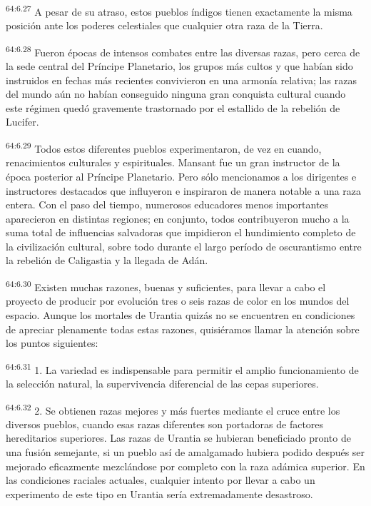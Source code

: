 \par
\textsuperscript{64:6.27} A pesar de su atraso, estos pueblos índigos tienen exactamente la misma posición ante los poderes celestiales que cualquier otra raza de la Tierra.

\par
\textsuperscript{64:6.28} Fueron épocas de intensos combates entre las diversas razas, pero cerca de la sede central del Príncipe Planetario, los grupos más cultos y que habían sido instruidos en fechas más recientes convivieron en una armonía relativa; las razas del mundo aún no habían conseguido ninguna gran conquista cultural cuando este régimen quedó gravemente trastornado por el estallido de la rebelión de Lucifer.

\par
\textsuperscript{64:6.29} Todos estos diferentes pueblos experimentaron, de vez en cuando, renacimientos culturales y espirituales. Mansant fue un gran instructor de la época posterior al Príncipe Planetario. Pero sólo mencionamos a los dirigentes e instructores destacados que influyeron e inspiraron de manera notable a una raza entera. Con el paso del tiempo, numerosos educadores menos importantes aparecieron en distintas regiones; en conjunto, todos contribuyeron mucho a la suma total de influencias salvadoras que impidieron el hundimiento completo de la civilización cultural, sobre todo durante el largo período de oscurantismo entre la rebelión de Caligastia y la llegada de Adán.

\par
\textsuperscript{64:6.30} Existen muchas razones, buenas y suficientes, para llevar a cabo el proyecto de producir por evolución tres o seis razas de color en los mundos del espacio. Aunque los mortales de Urantia quizás no se encuentren en condiciones de apreciar plenamente todas estas razones, quisiéramos llamar la atención sobre los puntos siguientes:

\par
\textsuperscript{64:6.31} 1. La variedad es indispensable para permitir el amplio funcionamiento de la selección natural, la supervivencia diferencial de las cepas superiores.

\par
\textsuperscript{64:6.32} 2. Se obtienen razas mejores y más fuertes mediante el cruce entre los diversos pueblos, cuando esas razas diferentes son portadoras de factores hereditarios superiores. Las razas de Urantia se hubieran beneficiado pronto de una fusión semejante, si un pueblo así de amalgamado hubiera podido después ser mejorado eficazmente mezclándose por completo con la raza adámica superior. En las condiciones raciales actuales, cualquier intento por llevar a cabo un experimento de este tipo en Urantia sería extremadamente desastroso.

